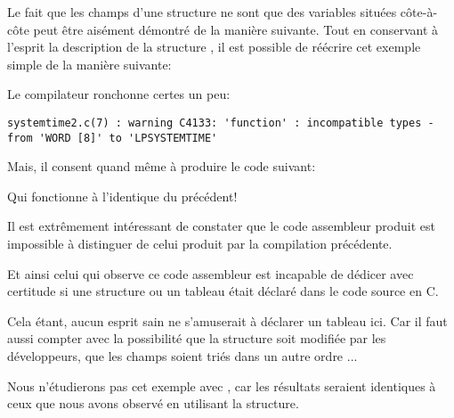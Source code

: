 Le fait que les champs d'une structure ne sont que des variables situées côte-à-côte peut être
aisément démontré de la manière suivante.
Tout en conservant à l'esprit la description de la structure , il est possible de
réécrire cet exemple simple de la manière suivante:



Le compilateur ronchonne certes un peu:

\begin{lstlisting}
systemtime2.c(7) : warning C4133: 'function' : incompatible types - from 'WORD [8]' to 'LPSYSTEMTIME'
\end{lstlisting}

Mais, il consent quand même à produire le code suivant:



Qui fonctionne à l'identique du précédent!

Il est extrêmement intéressant de constater que le code assembleur produit est impossible à
distinguer de celui produit par la compilation précédente.

Et ainsi celui qui observe ce code assembleur est incapable de dédicer avec certitude si une
structure ou un tableau était déclaré dans le code source en C.

Cela étant, aucun esprit sain ne s'amuserait à déclarer un tableau ici. Car il faut aussi compter
avec la possibilité que la structure soit modifiée par les développeurs, que les champs soient
triés dans un autre ordre ...

Nous n'étudierons pas cet exemple avec \olly, car les résultats seraient identiques à ceux que nous
avons observé en utilisant la structure.

